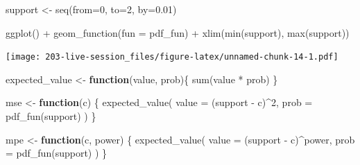 \documentclass[
]{book}
\newenvironment{Shaded}{\begin{snugshade}}{\end{snugshade}}
\newcommand{\AttributeTok}[1]{\textcolor[rgb]{0.77,0.63,0.00}{#1}}
\newcommand{\ControlFlowTok}[1]{\textcolor[rgb]{0.13,0.29,0.53}{\textbf{#1}}}
\newcommand{\DecValTok}[1]{\textcolor[rgb]{0.00,0.00,0.81}{#1}}
\newcommand{\FloatTok}[1]{\textcolor[rgb]{0.00,0.00,0.81}{#1}}
\newcommand{\FunctionTok}[1]{\textcolor[rgb]{0.00,0.00,0.00}{#1}}
\newcommand{\NormalTok}[1]{#1}
\newcommand{\OtherTok}[1]{\textcolor[rgb]{0.56,0.35,0.01}{#1}}
\newcommand{\SpecialCharTok}[1]{\textcolor[rgb]{0.00,0.00,0.00}{#1}}
\theoremstyle{definition}
\theoremstyle{definition}
\theoremstyle{definition}
\theoremstyle{definition}
\theoremstyle{remark}
\begin{document}
\begin{Shaded}
\begin{Highlighting}[]
\NormalTok{support }\OtherTok{\textless{}{-}} \FunctionTok{seq}\NormalTok{(}\AttributeTok{from=}\DecValTok{0}\NormalTok{, }\AttributeTok{to=}\DecValTok{2}\NormalTok{, }\AttributeTok{by=}\FloatTok{0.01}\NormalTok{)}
\end{Highlighting}
\end{Shaded}

\begin{Shaded}
\begin{Highlighting}[]
\FunctionTok{ggplot}\NormalTok{() }\SpecialCharTok{+} 
  \FunctionTok{geom\_function}\NormalTok{(}\AttributeTok{fun =}\NormalTok{ pdf\_fun) }\SpecialCharTok{+} 
  \FunctionTok{xlim}\NormalTok{(}\FunctionTok{min}\NormalTok{(support), }\FunctionTok{max}\NormalTok{(support))}
\end{Highlighting}
\end{Shaded}

\texttt{[image: 203-live-session\_files/figure-latex/unnamed-chunk-14-1.pdf]}

\begin{Shaded}
\begin{Highlighting}[]
\NormalTok{expected\_value }\OtherTok{\textless{}{-}} \ControlFlowTok{function}\NormalTok{(value, prob)\{}
  \FunctionTok{sum}\NormalTok{(value }\SpecialCharTok{*}\NormalTok{ prob)}
\NormalTok{\}}

\NormalTok{mse }\OtherTok{\textless{}{-}} \ControlFlowTok{function}\NormalTok{(c) \{ }
  \FunctionTok{expected\_value}\NormalTok{(}
    \AttributeTok{value =}\NormalTok{ (support }\SpecialCharTok{{-}}\NormalTok{ c)}\SpecialCharTok{\^{}}\DecValTok{2}\NormalTok{, }
    \AttributeTok{prob  =} \FunctionTok{pdf\_fun}\NormalTok{(support)}
\NormalTok{  )  }
\NormalTok{\}}

\NormalTok{mpe }\OtherTok{\textless{}{-}} \ControlFlowTok{function}\NormalTok{(c, power) \{ }
  \FunctionTok{expected\_value}\NormalTok{(}
    \AttributeTok{value =}\NormalTok{ (support }\SpecialCharTok{{-}}\NormalTok{ c)}\SpecialCharTok{\^{}}\NormalTok{power, }
    \AttributeTok{prob  =} \FunctionTok{pdf\_fun}\NormalTok{(support)}
\NormalTok{  )}
\NormalTok{\}}
\end{Highlighting}
\end{Shaded}
\end{document}
